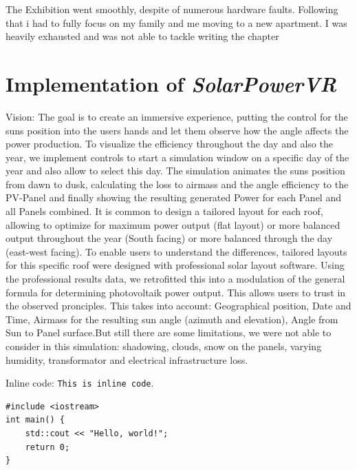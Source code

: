\documentclass[draft, final]{vutinfth} %
\begin{document}
The Exhibition went smoothly, despite of numerous hardware faults. Following that i had to fully focus on my family and me moving to a new apartment. I was heavily exhausted and was not able to tackle writing the chapter 


\chapter{Implementation of \textit{SolarPowerVR}}

Vision: The goal is to create an immersive experience, putting the control for the suns position into the users hands and let them observe how the angle affects the power production. To visualize the efficiency throughout the day and also the year, we implement controls to start a simulation window on a specific day of the year and also allow to select this day. The simulation animates the suns position from dawn to dusk, calculating the loss to airmass and the angle efficiency to the PV-Panel and finally showing the resulting generated Power for each Panel and all Panels combined. It is common to design a tailored layout for each roof, allowing to optimize for maximum power output (flat layout) or more balanced output throughout the year (South facing) or more balanced through the day (east-west facing). To enable users to understand the differences, tailored layouts for this specific roof were designed with professional solar layout software. Using the professional results data, we retrofitted this into a modulation of the general formula for determining photovoltaik power output. This allows users to trust in the observed pronciples. This takes into account: Geographical position, Date and Time, Airmass for the resulting sun angle (azimuth and elevation), Angle from Sun to Panel surface.But still there are some limitations, we were not able to consider in this simulation: shadowing, clouds, snow on the panels, varying humidity, transformator and electrical infrastructure loss.

Inline code: \lstinline|This is inline code|.

\begin{Verbatim}
#include <iostream>
int main() {
    std::cout << "Hello, world!";
    return 0;
}
\end{Verbatim}
\end{document}
